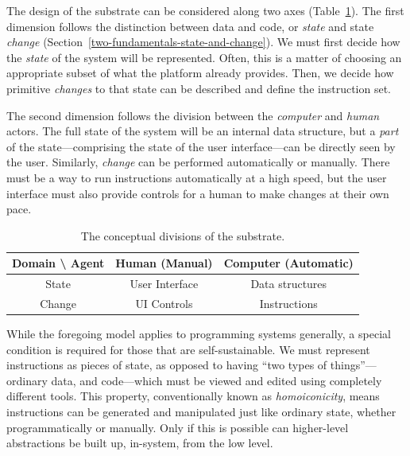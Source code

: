 \documentclass[ twoside,openright,titlepage,numbers=noenddot,headinclude,footinclude,cleardoublepage=empty,abstract=on,
                BCOR=5mm,paper=a4,fontsize=11pt
                ]{scrreprt}
\newcommand{\joel}[1]{}
\theoremstyle{definition}
\begin{document}
The design of the substrate can be considered along two axes
(Table~\ref{substr-tab}). The first dimension follows the distinction
between data and code, or \emph{state} and state \emph{change}
(Section~\ref{two-fundamentals-state-and-change}). We must first decide
how the \emph{state} of the system will be represented. Often, this is a
matter of choosing an appropriate subset of what the platform already
provides. Then, we decide how primitive \emph{changes} to that state can
be described and define the instruction set.

The second dimension follows the division between the \emph{computer}
and \emph{human} actors. The full state of the system will be an
internal data structure, but a \emph{part} of the state---comprising the
state of the user interface---can be directly seen by the user.
Similarly, \emph{change} can be performed automatically or manually.
There must be a way to run instructions automatically at a high speed,
but the user interface must also provide controls for a human to make
changes at their own pace.

\joel{
| Domain \\ Agent | Human (Manual) | Computer (Automatic) |
|:--------------:|:--------------:|:--------------------:|
|      State     | User Interface |    Data structures   |
|     Change     |   UI Controls  |     Instructions     |
}

\begin{table}
\centering\small
\caption{The conceptual divisions of the substrate.}
\begin{tabular}{c|cc}
\toprule
Domain \textbackslash{} Agent & Human (Manual) & Computer (Automatic) \\
\midrule
State & User Interface & Data structures \\
Change & UI Controls & Instructions \\
\bottomrule
\end{tabular}
\label{substr-tab}
\end{table}

While the foregoing model applies to programming systems generally, a
special condition is required for those that are self-sustainable. We
must represent instructions as pieces of state, as opposed to having
``two types of things''---ordinary data, and code---which must be viewed
and edited using completely different tools. This property,
conventionally known as \emph{homoiconicity}, means instructions can be
generated and manipulated just like ordinary state, whether
programmatically or manually. Only if this is possible can higher-level
abstractions be built up, in-system, from the low level.
\end{document}
